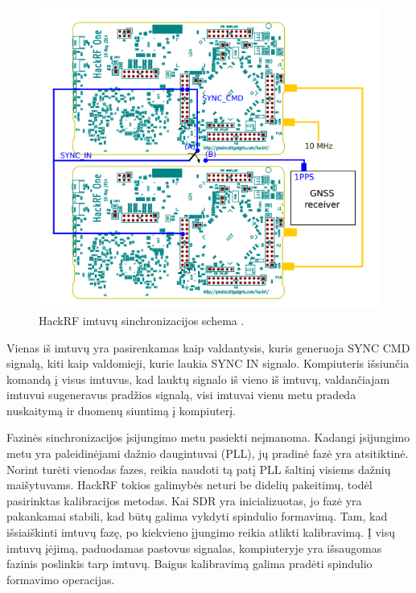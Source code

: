 \documentclass[main.tex]{subfiles}
\begin{document}
\begin{figure}[h]
    \begin{centering}
    \includegraphics[scale=0.8]{drawings/hackrf_sync}
    \par\end{centering}
    \protect\caption{\label{fig:hackrf_sync}HackRF imtuvų sinchronizacijos schema \cite{hackrf_sync}.}
\end{figure}

Vienas iš imtuvų yra pasirenkamas kaip valdantysis, kuris generuoja SYNC CMD signalą,
kiti kaip valdomieji, kurie laukia SYNC IN signalo. Kompiuteris
išsiunčia komandą į visus imtuvus, kad lauktų signalo iš vieno iš imtuvų,
valdančiajam imtuvui sugeneravus pradžios signalą, visi imtuvai vienu metu pradeda
nuskaitymą ir duomenų siuntimą į kompiuterį.

Fazinės sinchronizacijos įsijungimo metu pasiekti neįmanoma. Kadangi įsijungimo metu yra
paleidinėjami dažnio daugintuvai (PLL), jų pradinė fazė yra atsitiktinė.
Norint turėti vienodas fazes, reikia naudoti tą patį PLL šaltinį visiems
dažnių maišytuvams. HackRF tokios galimybės neturi be didelių pakeitimų, todėl pasirinktas
kalibracijos metodas.
Kai SDR yra inicializuotas, jo fazė yra pakankamai stabili, kad būtų galima
vykdyti spindulio formavimą.
Tam, kad išsiaiškinti imtuvų fazę, po kiekvieno įjungimo reikia atlikti kalibravimą.
Į visų imtuvų įėjimą, paduodamas pastovus signalas, kompiuteryje yra išsaugomas
fazinis poslinkis tarp imtuvų. Baigus kalibravimą galima pradėti spindulio
formavimo operacijas.
\end{document}
